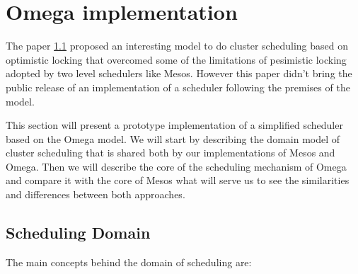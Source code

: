 \documentclass{svjour3}                     %
\begin{document}
\section{Omega implementation}
\label{sec:implementation}

The paper \ref{} proposed an interesting model to do cluster
scheduling based on optimistic locking that overcomed some of the
limitations of pesimistic locking adopted by two level schedulers like
Mesos. However this paper didn't bring the public release of an
implementation of a scheduler following the premises of the
model. 

This section will present a prototype implementation of a simplified
scheduler based on the Omega model. We will start by describing the
domain model of cluster scheduling that is shared both by our
implementations of Mesos and Omega. Then we will describe the core of
the scheduling mechanism of Omega and compare it with the core of
Mesos what will serve us to see the similarities and differences
between both approaches.

\subsection{Scheduling Domain}

The main concepts behind the domain of scheduling are:
\end{document}

